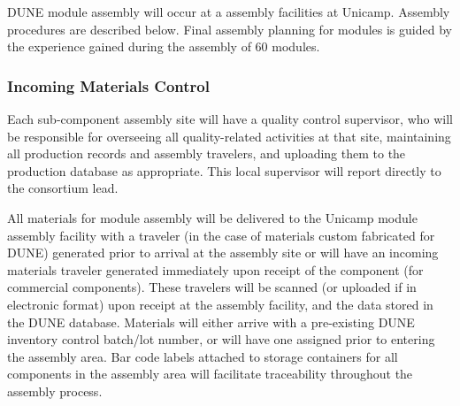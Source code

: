 DUNE   module assembly will occur at a  assembly facilities at Unicamp.  Assembly procedures are described below.  Final assembly planning for  modules is guided by the experience gained during the assembly of \num{60}   modules. 


\subsubsection{Incoming Materials Control}


Each  sub-component assembly site will have a quality control supervisor, who will be responsible for overseeing all quality-related activities at that site, maintaining all production records and assembly travelers, and uploading them to the production database as appropriate.   This local supervisor will report directly to the  consortium lead.

All materials for  module assembly will be delivered to the Unicamp module assembly facility with a  traveler (in the case of materials custom fabricated for DUNE) generated prior to arrival at the assembly site or will have an incoming materials traveler generated immediately upon receipt of the component (for commercial components).  These travelers will be scanned (or uploaded if in electronic format) upon receipt at the assembly facility, and the data stored in the DUNE  database.  Materials will either arrive with a pre-existing DUNE inventory control batch/lot number, or will have one assigned prior to entering the assembly area.  Bar code labels attached to storage containers for all components in the assembly area will facilitate traceability throughout the assembly process.


